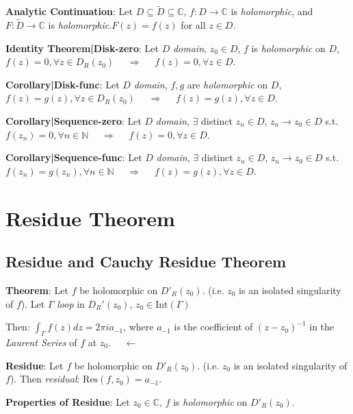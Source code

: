 \documentclass[9pt]{article}
\begin{document}
\textbf{Analytic Continuation}: Let $D\subseteq\widetilde{D}\subseteq\mathbb{C}$, $f:D\to\mathbb{C}$ is \textit{holomorphic}, and $F:\widetilde{D}\to\mathbb{C}$ is \textit{holomorphic}.\quad $F(z)=f(z)$ for all $z\in D$.

\textbf{Identity Theorem|Disk-zero}: Let $D$ \textit{domain}, $z_0\in D$, $f$ is \textit{holomorphic} on $D$, $f(z)=0,\forall z\in D_{R}(z_0)$ \ \ $\Rightarrow$ \ \ $f(z)=0,\forall z\in D$.

\quad\textbf{Corollary|Disk-func}: Let $D$ \textit{domain}, $f,g$ are \textit{holomorphic} on $D$, $f(z)=g(z),\forall z\in D_{R}(z_0)$ \ \ $\Rightarrow$ \ \ $f(z)=g(z),\forall z\in D$.

\quad\textbf{Corollary|Sequence-zero}: Let $D$ \textit{domain}, $\exists$ distinct $z_n\in D$, $z_n\to z_0\in D$ s.t. $f(z_n)=0,\forall n\in\mathbb{N}$ \ \ $\Rightarrow$ \ \ $f(z)=0,\forall z\in D$.

\quad\textbf{Corollary|Sequence-func}: Let $D$ \textit{domain}, $\exists$ distinct $z_n\in D$, $z_n\to z_0\in D$ s.t. $f(z_n)=g(z_n),\forall n\in\mathbb{N}$ \ \ $\Rightarrow$ \ \ $f(z)=g(z),\forall z\in D$.


\section{Residue Theorem} %

\subsection{Residue and Cauchy Residue Theorem} %

\textbf{Theorem}: Let $f$ be holomorphic on $D'_{R}(z_0)$. {\scriptsize (i.e. $z_0$ is an isolated singularity of $f$)}. Let $\Gamma$ \textit{loop} in $D_{R}'(z_0)$, $z_0\in\text{Int}(\Gamma)$

\qquad\qquad\quad Then: $\int_{\Gamma}f(z)dz=2\pi i a_{-1}$, {\footnotesize where $a_{-1}$ is the coefficient of $(z-z_0)^{-1}$ in the \textit{Laurent Series} of $f$ at $z_0$.} \qquad \qquad \qquad \ \ $\leftarrow$

\textbf{Residue}: Let $f$ be holomorphic on $D'_{R}(z_0)$. {\scriptsize (i.e. $z_0$ is an isolated singularity of $f$)}. Then \textit{residual}: $\text{Res}(f,z_0)=a_{-1}$. 

\textbf{Properties of Residue}: Let $z_0\in\mathbb{C}$, $f$ is \textit{holomorphic} on $D'_{R}(z_0)$.
\end{document}
